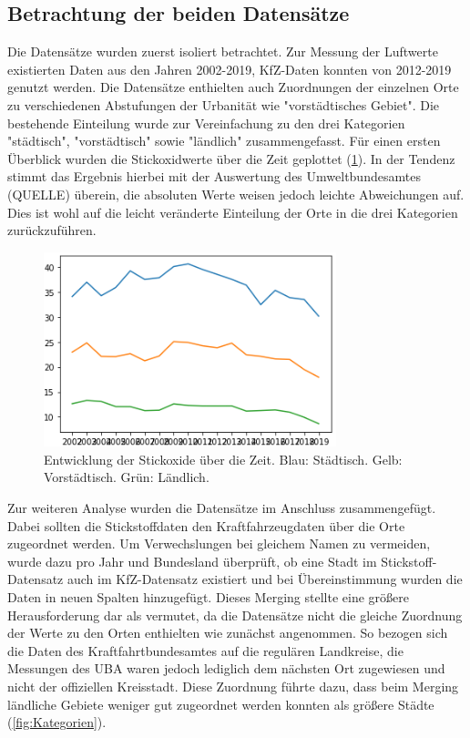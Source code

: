 \documentclass[11pt,a4paper,oneside,german]{article}
\begin{document}
\subsection{Betrachtung der beiden Datensätze}

Die Datensätze wurden zuerst isoliert betrachtet. Zur Messung der Luftwerte existierten Daten aus den Jahren 2002-2019, KfZ-Daten konnten von 2012-2019 genutzt werden. Die  Datensätze enthielten auch Zuordnungen der einzelnen Orte zu verschiedenen Abstufungen der Urbanität wie "vorstädtisches Gebiet". Die bestehende Einteilung wurde zur Vereinfachung zu den drei Kategorien "städtisch", "vorstädtisch" sowie "ländlich" zusammengefasst. Für einen ersten Überblick wurden die Stickoxidwerte über die Zeit geplottet (\ref{fig:NO2Entwicklung}). In der Tendenz stimmt das Ergebnis hierbei mit der Auswertung des Umweltbundesamtes (QUELLE) überein, die absoluten Werte weisen jedoch leichte Abweichungen auf. Dies ist wohl auf die leicht veränderte Einteilung der Orte in die drei Kategorien zurückzuführen.\\

\begin{figure}[h!]
	\centering
	\includegraphics[width=8.5cm]{NO2Entwicklung.png}
	\caption{Entwicklung der Stickoxide über die Zeit. Blau: Städtisch. Gelb: Vorstädtisch. Grün: Ländlich.}
	\label{fig:NO2Entwicklung}
\end{figure}

Zur weiteren Analyse wurden die Datensätze im Anschluss zusammengefügt. Dabei sollten die Stickstoffdaten den Kraftfahrzeugdaten über die Orte zugeordnet werden. Um Verwechslungen bei gleichem Namen zu vermeiden, wurde dazu pro Jahr und Bundesland überprüft, ob eine Stadt im Stickstoff-Datensatz auch im KfZ-Datensatz existiert und bei Übereinstimmung wurden die Daten in neuen Spalten hinzugefügt. Dieses Merging stellte eine größere Herausforderung dar als vermutet, da die Datensätze nicht die gleiche Zuordnung der Werte zu den Orten enthielten wie zunächst angenommen. So bezogen sich die Daten des Kraftfahrtbundesamtes auf die regulären Landkreise, die Messungen des UBA waren jedoch lediglich dem nächsten Ort zugewiesen und nicht der offiziellen Kreisstadt. Diese Zuordnung führte dazu, dass beim Merging ländliche Gebiete weniger gut zugeordnet werden konnten als größere Städte (\ref{fig:Kategorien}).\\
\end{document}
